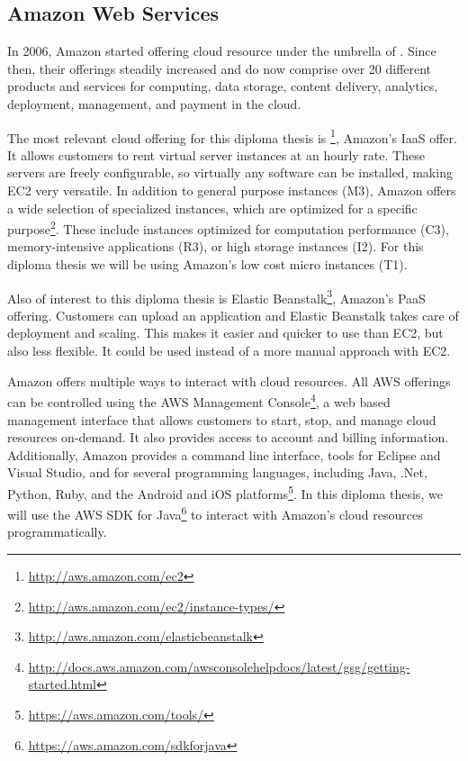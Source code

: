 \subsection{Amazon Web Services}

In 2006, Amazon started offering cloud resource under the umbrella of .
Since then, their offerings steadily increased and do now comprise over 20 different products and services for computing, data storage, content delivery, analytics, deployment, management, and payment in the cloud.

The most relevant cloud offering for this diploma thesis is \footnote{\url{http://aws.amazon.com/ec2}}, Amazon's IaaS offer.
It allows customers to rent virtual server instances at an hourly rate.
These servers are freely configurable, so virtually any software can be installed, making EC2 very versatile.
In addition to general purpose instances (M3), Amazon offers a wide selection of specialized instances, which are optimized for a specific purpose\footnote{\url{http://aws.amazon.com/ec2/instance-types/}}.
These include instances optimized for computation performance (C3), memory-intensive applications (R3), or high storage instances (I2).
For this diploma thesis we will be using Amazon's low cost micro instances (T1).

Also of interest to this diploma thesis is Elastic Beanstalk\footnote{\url{http://aws.amazon.com/elasticbeanstalk}}, Amazon's PaaS offering.
Customers can upload an application and Elastic Beanstalk takes care of deployment and scaling.
This makes it easier and quicker to use than EC2, but also less flexible.
It could be used instead of a more manual approach with EC2.

Amazon offers multiple ways to interact with cloud resources.
All AWS offerings can be controlled using the AWS Management Console\footnote{\url{http://docs.aws.amazon.com/awsconsolehelpdocs/latest/gsg/getting-started.html}}, a web based management interface that allows customers to start, stop, and manage cloud resources on-demand.
It also provides access to account and billing information.
Additionally, Amazon provides a command line interface, tools for Eclipse and Visual Studio, and  for several programming languages, including Java, .Net, Python, Ruby, and the Android and iOS platforms\footnote{\url{https://aws.amazon.com/tools/}}.
In this diploma thesis, we will use the AWS SDK for Java\footnote{\url{https://aws.amazon.com/sdkforjava}} to interact with Amazon's cloud resources programmatically.
